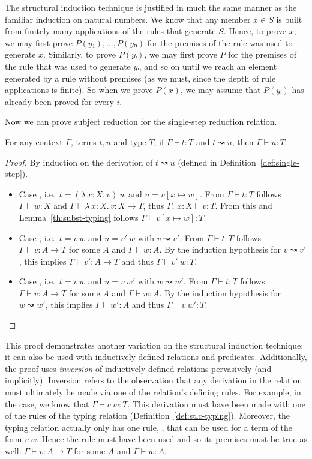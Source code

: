 \documentclass{article}
\theoremstyle{definition}
\newcommand{\Lam}[2]{λ\,#1.\, #2}
\newcommand{\lbl}[1]{\RightTirNameStyle{#1}}
\begin{document}
The structural induction technique is justified in much the same manner as the familiar induction on natural numbers.
We know that any member $x ∈ S$ is built from finitely many applications of the rules that generate $S$.
Hence, to prove $x$, we may first prove $P(y₁), \dots, P(yₙ)$ for the premises of the rule was used to generate $x$.
Similarly, to prove $P(yᵢ)$, we may first prove $P$ for the premises of the rule that was used to generate $yᵢ$, and so on until we reach an element generated by a rule without premises (as we must, since the depth of rule applications is finite).
So when we prove $P(x)$, we may assume that $P(yᵢ)$ has already been proved for every $i$.

Now we can prove subject reduction for the single-step reduction relation.

\begin{lemma}\label{lem:subject-reduction-single}
  For any context $Γ$, terms $t,u$ and type $T$, if $Γ ⊢ t : T$ and $t ↝ u$, then $Γ ⊢ u : T$.
\end{lemma}

\begin{proof}
  By induction on the derivation of $t ↝ u$ (defined in Definition~\ref{def:single-step}).
  \begin{itemize}
    \item Case \lbl{β}, i.e.\ $t = (\Lam{x : X}{v})~w$ and $u = v[x ↦ w]$.
          From $Γ ⊢ t : T$ follows $Γ ⊢ w : X$ and $Γ ⊢ \Lam{x : X}{v} : X → T$, thus $Γ,\, x : X ⊢ v : T$.
          From this and Lemma~\ref{th:subst-typing} follows $Γ ⊢ v[x ↦ w] : T$.
    \item Case \lbl{CongAppL}, i.e.\ $t = v~w$ and $u = v'~w$ with $v ↝ v'$.
          From $Γ ⊢ t : T$ follows $Γ ⊢ v : A → T$ for some $A$ and $Γ ⊢ w : A$.
          By the induction hypothesis for $v ↝ v'$, this implies $Γ ⊢ v' : A → T$ and thus $Γ ⊢ v'~w : T$.
    \item Case \lbl{CongAppR}, i.e.\ $t = v~w$ and $u = v~w'$ with $w ↝ w'$.
          From $Γ ⊢ t : T$ follows $Γ ⊢ v : A → T$ for some $A$ and $Γ ⊢ w : A$.
          By the induction hypothesis for $w ↝ w'$, this implies $Γ ⊢ w' : A$ and thus $Γ ⊢ v~w' : T$.
  \end{itemize}
\end{proof}

This proof demonstrates another variation on the structural induction technique: it can also be used with inductively defined relations and predicates.
Additionally, the proof uses \emph{inversion} of inductively defined relations pervasively (and implicitly).
Inversion refers to the observation that any derivation in the relation must ultimately be made via one of the relation's defining rules.
For example, in the \lbl{CongAppL} case, we know that $Γ ⊢ v~w : T$.
This derivation must have been made with one of the rules of the typing relation (Definition~\ref{def:stlc-typing}).
Moreover, the typing relation actually only has one rule, \lbl{App}, that can be used for a term of the form $v~w$.
Hence the \lbl{App} rule must have been used and so its premises must be true as well: $Γ ⊢ v : A → T$ for some $A$ and $Γ ⊢ w : A$.
\end{document}
